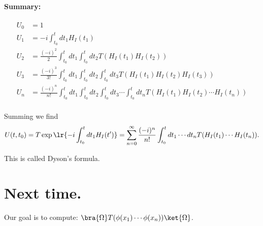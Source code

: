 \paragraph{Summary:}
\begin{equation}\label{eqn:qftLecture13:1120}
\begin{aligned}
U_0 &= 1 \\
U_1 &= -i \int_{t_0}^t dt_1 H_I(t_1) \\
U_2 &= \frac{(-i)^2}{2}
\int_{t_0}^t dt_1
\int_{t_0}^t dt_2
T( H_I(t_1)
H_I(t_2) ) \\
U_3 &= \frac{(-i)^3}{3!}
\int_{t_0}^t dt_1
\int_{t_0}^t dt_2
\int_{t_0}^t dt_3
T( H_I(t_1)
H_I(t_2)
H_I(t_3)
) \\
U_n &= \frac{(-i)^n}{n!}
\int_{t_0}^t dt_1
\int_{t_0}^t dt_2
\int_{t_0}^t dt_3
\cdots
\int_{t_0}^t dt_n
T( H_I(t_1)
H_I(t_2)
\cdots
H_I(t_n)
) \\
\end{aligned}
\end{equation}

Summing we find
\begin{equation}\label{eqn:qftLecture13:1140}
U(t, t_0) = T \exp\lr{-i
\int_{t_0}^t dt_1 H_I(t')
}
=
\sum_{n = 0}^\infty
\frac{(-i)^n}{n!} \int_{t_0}^t dt_1 \cdots dt_n T( H_I(t_1) \cdots H_I(t_n) ).
\end{equation}

This is called Dyson's formula.

\section{Next time.}

Our goal is to compute: \( \bra{\Omega} T(\phi(x_1) \cdots \phi(x_n)) \ket{\Omega} \).

